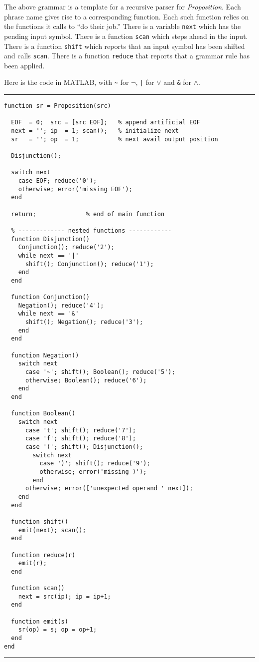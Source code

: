 \noindent 
The above grammar is a template for a recursive parser 
for {\em Proposition}.  
Each phrase name gives rise to a corresponding function.  
Each such function relies on the functions it calls to ``do their job.''  
There is a variable {\tt next} which has the pending input symbol.  
There is a function {\tt scan} which steps ahead in the input.  
There is a function {\tt shift} which
reports that an input symbol has been shifted and calls {\tt scan}.
There is a function {\tt reduce} that reports that a grammar rule 
has been applied.
  
Here is the code in MATLAB, 
with \verb+~+ for $\neg$, \verb+|+ for $\vee$ and \verb+&+ for $\wedge$.

\vspace{1em}
\hrule
\begin{verbatim}
function sr = Proposition(src)

  EOF  = 0;  src = [src EOF];   % append artificial EOF
  next = ''; ip  = 1; scan();   % initialize next
  sr   = ''; op  = 1;           % next avail output position
    
  Disjunction();
  
  switch next
    case EOF; reduce('0');
    otherwise; error('missing EOF'); 
  end
  
  return;              % end of main function
  
  % ------------- nested functions ------------
  function Disjunction()
    Conjunction(); reduce('2');
    while next == '|'
      shift(); Conjunction(); reduce('1');
    end
  end

  function Conjunction()
    Negation(); reduce('4');
    while next == '&'
      shift(); Negation(); reduce('3');
    end
  end

  function Negation()
    switch next
      case '~'; shift(); Boolean(); reduce('5');
      otherwise; Boolean(); reduce('6');
    end
  end

  function Boolean()
    switch next
      case 't'; shift(); reduce('7');
      case 'f'; shift(); reduce('8');
      case '('; shift(); Disjunction();
        switch next
          case ')'; shift(); reduce('9');
          otherwise; error('missing )');
        end
      otherwise; error(['unexpected operand ' next]);
    end
  end

  function shift()
    emit(next); scan();
  end

  function reduce(r)
    emit(r);
  end

  function scan()
    next = src(ip); ip = ip+1;
  end

  function emit(s)
    sr(op) = s; op = op+1;
  end
end
\end{verbatim}
\hrule
\vspace{1em}

